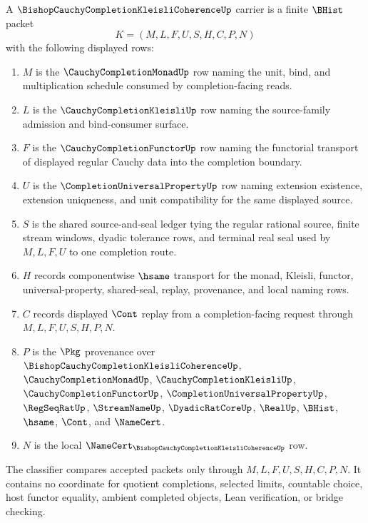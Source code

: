 \begin{definition}
\label{def:bishop-cauchy-completion-kleisli-coherence-carrier}
A $\BishopCauchyCompletionKleisliCoherenceUp$ carrier is a finite $\BHist$ packet
$$
K=(M,L,F,U,S,H,C,P,N)
$$
with the following displayed rows:
\begin{enumerate}
\item $M$ is the $\CauchyCompletionMonadUp$ row naming the unit, bind, and multiplication schedule consumed by completion-facing reads.
\item $L$ is the $\CauchyCompletionKleisliUp$ row naming the source-family admission and bind-consumer surface.
\item $F$ is the $\CauchyCompletionFunctorUp$ row naming the functorial transport of displayed regular Cauchy data into the completion boundary.
\item $U$ is the $\CompletionUniversalPropertyUp$ row naming extension existence, extension uniqueness, and unit compatibility for the same displayed source.
\item $S$ is the shared source-and-seal ledger tying the regular rational source, finite stream windows, dyadic tolerance rows, and terminal real seal used by $M,L,F,U$ to one completion route.
\item $H$ records componentwise $\hsame$ transport for the monad, Kleisli, functor, universal-property, shared-seal, replay, provenance, and local naming rows.
\item $C$ records displayed $\Cont$ replay from a completion-facing request through $M,L,F,U,S,H,P,N$.
\item $P$ is the $\Pkg$ provenance over $\BishopCauchyCompletionKleisliCoherenceUp$, $\CauchyCompletionMonadUp$, $\CauchyCompletionKleisliUp$, $\CauchyCompletionFunctorUp$, $\CompletionUniversalPropertyUp$, $\RegSeqRatUp$, $\StreamNameUp$, $\DyadicRatCoreUp$, $\RealUp$, $\BHist$, $\hsame$, $\Cont$, and $\NameCert$.
\item $N$ is the local $\NameCert_{\BishopCauchyCompletionKleisliCoherenceUp}$ row.
\end{enumerate}
The classifier compares accepted packets only through $M,L,F,U,S,H,C,P,N$. It contains no coordinate for quotient completions, selected limits, countable choice, host functor equality, ambient completed objects, Lean verification, or bridge checking.
\end{definition}


